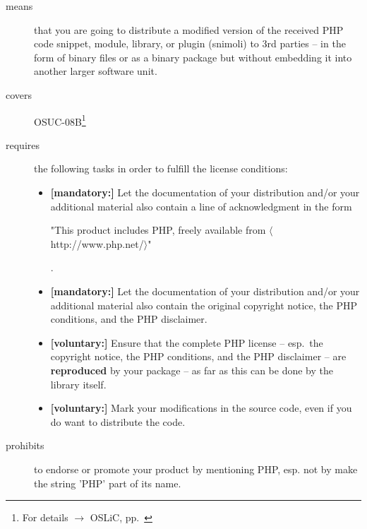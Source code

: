 \begin{description}

\item[means] that you are going to distribute a modified version of the received
PHP code snippet, module, library, or plugin (snimoli) to 3rd parties -- in the
form of binary files or as a binary package but without embedding it into
another larger software unit.

\item[covers] OSUC-08B\footnote{For details $\rightarrow$ OSLiC, pp.\
\pageref{OSUC-08B-DEF}}

\item[requires] the following tasks in order to fulfill the license conditions:
\begin{itemize}
  
  \item \textbf{[mandatory:]} Let the documentation of your distribution and/or
  your additional material also contain a line of acknowledgment in the form
  \begin{footnotesize}"This product includes PHP, freely available from
  $\langle$http://www.php.net/$\rangle$"\end{footnotesize}.
    
  \item \textbf{[mandatory:]} Let the documentation of your distribution and/or
  your additional material also contain the original copyright notice, the PHP
  conditions, and the PHP disclaimer.

  \item \textbf{[voluntary:]} Ensure that the complete PHP license -- esp.\ the
  copyright notice, the PHP conditions, and the PHP disclaimer -- are
  \textbf{reproduced} by your package -- as far as this can be done by the
  library itself.
  
  \item \textbf{[voluntary:]} Mark your modifications in the source code,
  even if you do want to distribute the code.

\end{itemize}

\item[prohibits] to endorse or promote your product by mentioning PHP, esp. not
by make the string 'PHP' part of its name.

\end{description}

